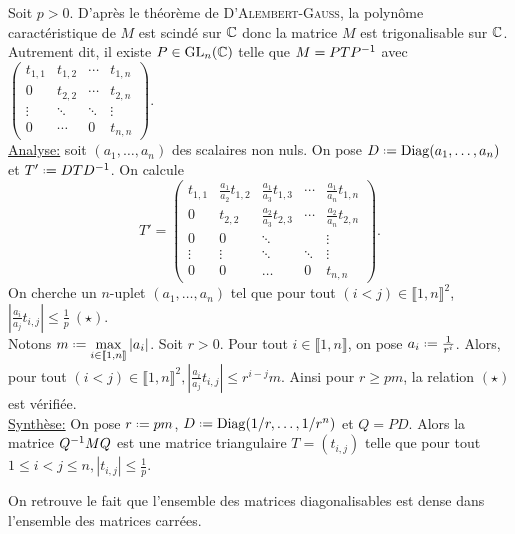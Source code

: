 \begin{solution}
    Soit $p > 0$. D'après le théorème de \textsc{D'Alembert}-\textsc{Gauss}, la polynôme caractéristique de $M$ est scindé sur $\mathbb{C}$ donc la matrice $M$ est trigonalisable sur $\mathbb{C}$. Autrement dit, il existe $P \in \mathrm{GL}_n(\mathbb{C})$ telle que $M = P T P^{-1}$ avec 
    $\begin{pmatrix}
        t_{1,1} & t_{1,2} & \cdots & t_{1,n} \\
        0 & t_{2,2} & \cdots & t_{2,n} \\
        \vdots & \ddots & \ddots & \vdots \\
        0 & \cdots & 0 & t_{n,n}
    \end{pmatrix}. $ \\
    \underline{Analyse:} soit $(a_1, \dots, a_n)$ des scalaires non nuls. On pose $D \defeq \Diag(a_1, \dots, a_n)$ et $T' \defeq D T \Inv{D}$. On calcule
    $$T'=
    \begin{pmatrix}
        t_{1,1} & \frac{a_1}{a_2}t_{1,2} & \frac{a_1}{a_3} t_{1,3} & \cdots & \frac{a_1}{a_n} t_{1,n} \\
        0 & t_{2,2} & \frac{a_2}{a_3}t_{2,3} & \cdots & \frac{a_2}{a_n} t_{2,n} \\
        0 & 0 & \ddots & & \vdots \\
        \vdots & \vdots & \ddots & \ddots & \vdots \\
        0 & 0 & \dots & 0 & t_{n,n}
    \end{pmatrix}.
    $$
    On cherche un $n$-uplet $(a_1, \dots, a_n)$ tel que pour tout $(i < j) \in \llbracket 1, n \rrbracket^2$, $\left| \frac{a_i}{a_j}t_{i,j} \right| \leqslant \frac{1}{p} \ (\star)$. \\
    Notons $m \defeq \max\limits_{i \in \llbracket 1, n \rrbracket} |a_i|$.
    Soit $r > 0$. Pour tout $i \in \llbracket 1, n \rrbracket$, on pose $a_i \defeq \frac{1}{r^i}$. Alors, pour tout $(i < j) \in \llbracket 1, n \rrbracket^2, \left| \frac{a_i}{a_j} t_{i,j} \right| \leqslant r^{i-j}m$. Ainsi pour $r \geqslant pm$, la relation $(\star)$ est vérifiée. \\
    \underline{Synthèse:} On pose $r \defeq pm$, $D \defeq \Diag(1/r, \dots, 1/r^n)$ et $Q = PD$. Alors la matrice $Q^{-1} M Q$ est une matrice triangulaire $T = (t_{i,j})$ telle que pour tout $1 \leqslant i < j \leqslant n, |t_{i,j}| \leqslant \frac{1}{p}$.
\end{solution}

\begin{remarque}
    On retrouve le fait que l'ensemble des matrices diagonalisables est dense dans l'ensemble des matrices carrées.
\end{remarque}


